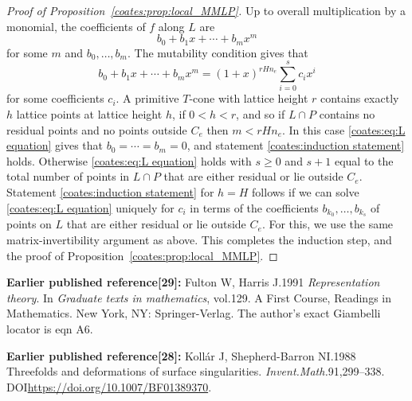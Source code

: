 \documentclass[11pt]{article}
\numberwithin{equation}{section}
\begin{document}
\begin{proof}[Proof of Proposition~\ref{coates:prop:local_MMLP}]
  Up to overall multiplication by a monomial, the coefficients of $f$ along $L$ are
  \[
    b_0 + b_1 x + \cdots + b_m x^m  
  \]
  for some $m$ and $b_0,\ldots,b_m$. The mutability condition gives that 
  \begin{equation}
    \label{coates:eq:L equation}
    b_0 + b_1 x + \cdots + b_m x^m = 
    (1+x)^{r H n_e } \sum_{i=0}^s c_i x^i
  \end{equation}
  for some coefficients $c_i$. A primitive $T$-cone with lattice height $r$ contains exactly $h$ lattice points at lattice height $h$, if $0 < h < r$, and so if $L \cap P$ contains no residual points and no points outside $C_e$ then $m<r H n_e$. In this case \eqref{coates:eq:L equation} gives that $b_0 = \cdots = b_m = 0$, and statement \eqref{coates:induction statement} holds. Otherwise \eqref{coates:eq:L equation} holds with $s \geq 0$ and $s+1$ equal to the total number of points in $L \cap P$ that are either residual or lie outside $C_e$. Statement \eqref{coates:induction statement} for $h=H$ follows if we can solve \eqref{coates:eq:L equation} uniquely for $c_i$ in terms of the coefficients $b_{k_0}, \ldots, b_{k_s}$ of points on $L$ that are either residual or lie outside $C_e$. For this, we use the same matrix-invertibility argument as above. This completes the induction step, and the proof of Proposition~\ref{coates:prop:local_MMLP}.
\end{proof}
\medskip\noindent\textbf{Earlier published reference[29]:} Fulton W, Harris J.1991 \emph{Representation theory}. In \emph{Graduate texts in mathematics}, vol.129. A First Course, Readings in Mathematics. New York, NY: Springer-Verlag. The author's exact Giambelli locator is eqn A6.\par
\noindent\textbf{Earlier published reference[28]:} Koll\'ar J, Shepherd-Barron NI.1988 Threefolds and deformations of surface singularities. \emph{Invent.Math.}91,299--338. DOI\url{https://doi.org/10.1007/BF01389370}.\par
\endgroup
\end{document}
